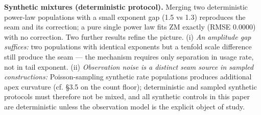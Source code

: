 \documentclass[11pt]{article}
\begin{document}
\textbf{Synthetic mixtures (deterministic protocol).} Merging two deterministic power-law populations with a small exponent gap (1.5 vs 1.3) reproduces the seam and its correction; a pure single power law fits ZM exactly (RMSE 0.0000) with no correction. Two further results refine the picture. (i) \emph{An amplitude gap suffices:} two populations with identical exponents but a tenfold scale difference still produce the seam --- the mechanism requires only separation in usage rate, not in tail exponent. (ii) \emph{Observation noise is a distinct seam source in sampled constructions:} Poisson-sampling synthetic rate populations produces additional apex curvature (cf. \S3.5 on the count floor); deterministic and sampled synthetic protocols must therefore not be mixed, and all synthetic controls in this paper are deterministic unless the observation model is the explicit object of study.
\end{document}
